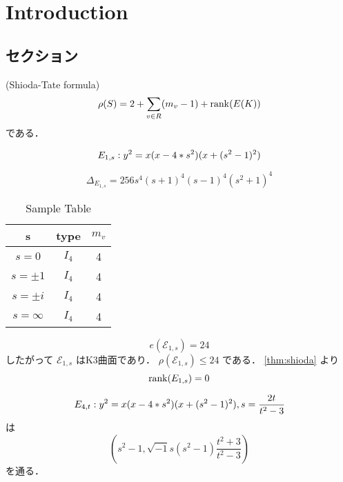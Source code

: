 \documentclass[main]{subfiles}
\begin{document}
\chapter{Introduction}
\section{セクション}

\begin{thm}{(Shioda-Tate formula)}
    \label{thm:shioda}
    \begin{equation}
        \rho (S) = 2 + \sum_{v \in R} (m_{v} - 1) + \operatorname{rank}(E(K))
    \end{equation}
    である．
\end{thm}


\begin{equation}
    \label{eq:E_{1s}}
    E_{1,s}: y^{2} = x(x - 4 * s^{2})(x + (s^{2} - 1)^{2})
\end{equation}

\begin{equation}
    \Delta_{E_{1,s}} = 256s^{4} (s + 1)^{4} (s - 1)^{4} (s^{2} + 1)^{4}
\end{equation}

\begin{table}[h]
    \centering
    \caption{Sample Table}
    \begin{tabular}{|c|c|c|}
        \hline
        s          & type  & $m_v$ \\
        \hline
        $s=0$      & $I_4$ & 4     \\
        \hline
        $s=\pm 1$  & $I_4$ & 4     \\
        \hline
        $s=\pm i$  & $I_4$ & 4     \\
        $s=\infty$ & $I_4$ & 4     \\
    \end{tabular}
    \label{tab:sample}
\end{table}

\begin{equation}
    e(\mathcal{E}_{1,s}) = 24
\end{equation}
したがって $\mathcal{E}_{1,s}$ はK3曲面であり． $\rho(\mathcal{E}_{1,s}) \leq 24$ である．
\ref{thm:shioda} より
\begin{equation}
    \operatorname{rank}(E_{1,s}) = 0
\end{equation}

\begin{equation}
    \label{eq:E_{4t}}
    E_{4,t}: y^{2} = x(x - 4 * s^{2})(x + (s^{2} - 1)^{2}), s = \frac{2t}{t^{2} - 3}
\end{equation}
は
\begin{equation}
    \left(s^{2} - 1, \sqrt{-1} s(s^{2} - 1) \frac{t^{2} + 3}{t^{2} - 3} \right)
\end{equation}
を通る．
\end{document}
